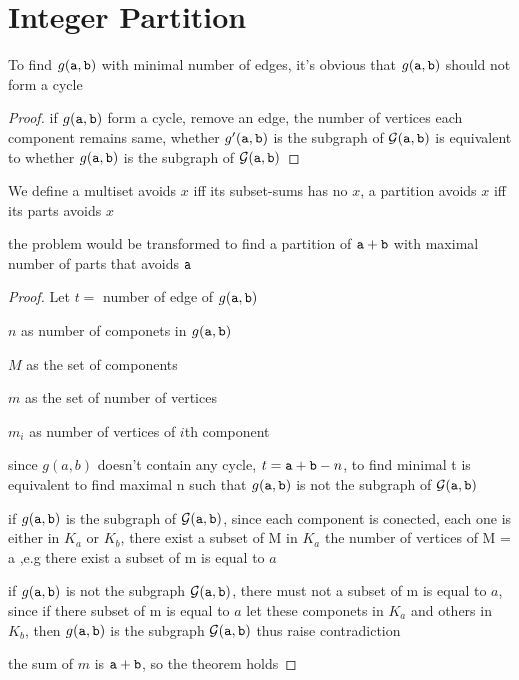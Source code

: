 \section{Integer Partition}

\noindent
To find $g(\mathtt{a},\mathtt{b})$ with minimal number of edges, it's obvious that $g(\mathtt{a} ,\mathtt{b})$ should not form a cycle

\begin{proof} 
if $g(\mathtt{a},\mathtt{b})$ form a cycle, remove an edge, the number of vertices each component remains same, whether $g'(\mathtt{a},\mathtt{b})$ is the subgraph of ${\cal G}(\mathtt{a},\mathtt{b})$ is equivalent to whether $g(\mathtt{a},\mathtt{b})$ is the subgraph of ${\cal G}(\mathtt{a},\mathtt{b})$
\end{proof}

\begin{definition}
We define a multiset avoids $x$ iff its subset-sums has no $x$, a partition avoids $x$ iff its parts avoids $x$
\end{definition}

\begin{theorem}

the problem would be transformed to find a partition of $\mathtt{a}+\mathtt{b}$ with  maximal number of parts that avoids $\mathtt{a}$

\end{theorem}

\begin{proof} 
Let $t =$ number of edge of $g(\mathtt{a},\mathtt{b})$

$n$ as number of componets in $g(\mathtt{a},\mathtt{b})$

$M$ as the set of components

$m$ as the set of number of vertices

$m_i$  as number of vertices of $i$th component

since $g(a,b)$ doesn't contain any cycle, $t = \mathtt{a}+\mathtt{b} - n$, to find minimal t is equivalent to find maximal n such that $g(\mathtt{a},\mathtt{b})$ is not the subgraph of ${\cal G}(\mathtt{a},\mathtt{b})$

if $g(\mathtt{a},\mathtt{b})$ is the subgraph of ${\cal G}(\mathtt{a},\mathtt{b})$, 
since each component is conected, each one is either in $K_a$ or $K_b$, there exist a subset of M in $K_a$ the number of vertices of M = a
,e.g there exist a subset of m is equal to $a$

if $g(\mathtt{a},\mathtt{b})$ is not the subgraph ${\cal G}(\mathtt{a},\mathtt{b})$, there must not a subset of m is equal to $a$, since if there subset of m is equal to $a$ let these componets in $K_a$ and others in $K_b$, then $g(\mathtt{a},\mathtt{b})$ is the subgraph ${\cal G}(\mathtt{a},\mathtt{b})$ thus raise contradiction


the sum of $m$ is $\mathtt{a}+\mathtt{b}$, so the theorem holds

\end{proof}

